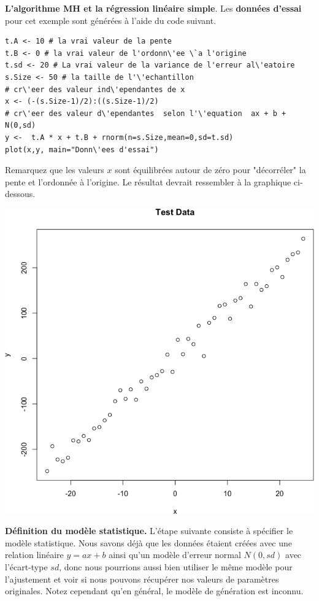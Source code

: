 \begin{Exemple} \textbf{L'algorithme MH et la r\'egression lin\'eaire simple}. Les \textbf{donn\'ees d'essai} pour cet exemple sont g\'en\'er\'ees \`a l'aide du code suivant.
\begin{lstlisting}
t.A <- 10 # la vrai valeur de la pente 
t.B <- 0 # la vrai valeur de l'ordonn\'ee \`a l'origine
t.sd <- 20 # La vrai valeur de la variance de l'erreur al\'eatoire 
s.Size <- 50 # la taille de l'\'echantillon
# cr\'eer des valeur ind\'ependantes de x
x <- (-(s.Size-1)/2):((s.Size-1)/2)
# cr\'eer des valeur d\'ependantes  selon l'\'equation  ax + b + N(0,sd)
y <-  t.A * x + t.B + rnorm(n=s.Size,mean=0,sd=t.sd)
plot(x,y, main="Donn\'ees d'essai")
\end{lstlisting}
\noindent Remarquez que les valeurs $x$ sont \'equilibr\'ees autour de z\'ero pour "d\'ecorr\'eler" la pente et l'ordonn\'ee \`a l’origine. Le r\'esultat devrait ressembler \`a la graphique ci-dessous. 
\begin{center}
\includegraphics[width=0.95\linewidth]{Images/example9a.png}
\end{center}
\item \textbf{D\'efinition du mod\`ele statistique.} L'\'etape suivante consiste \`a sp\'ecifier le mod\`ele statistique. Nous savons d\'ej\`a que les donn\'ees \'etaient cr\'e\'ees avec une relation lin\'eaire $y = ax + b$ ainsi qu'un mod\`ele d'erreur normal  $N(0,sd)$ avec l'\'ecart-type $sd$, donc nous pourrions aussi bien utiliser le même mod\`ele pour l'ajustement et voir si nous pouvons r\'ecup\'erer nos valeurs de param\`etres originales. Notez cependant qu'en g\'en\'eral, le mod\`ele de g\'en\'eration est inconnu. \\

\end{Exemple}
